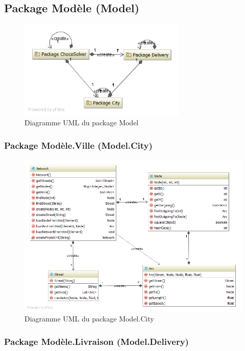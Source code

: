 \subsection{Package Mod\`ele (Model)}

\begin{figure}[h]
    \centering
    \includegraphics[width=80mm]{../diagrams/classes_packages/classes_packages/model/package_model.png}
    \caption{Diagramme UML du package Model}
    \label{diagram:uml_model}
\end{figure}
\pagebreak

\subsubsection{Package Mod\`ele.Ville (Model.City)}

\begin{figure}[h]
    \centering
    \includegraphics[width=160mm]{../diagrams/classes_packages/classes_packages/model/city.png}
    \caption{Diagramme UML du package Model.City}
    \label{diagram:uml_model_city}
\end{figure}
\pagebreak

\subsubsection{Package Mod\`ele.Livraison (Model.Delivery)}

